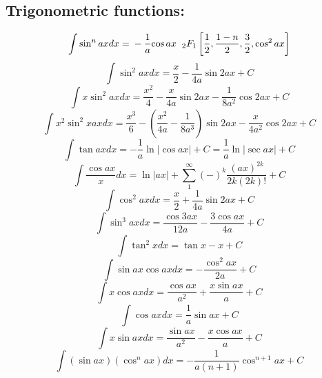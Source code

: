 \documentclass[12pt,a4paper]{article}
\begin{document}
		\subsection*{Trigonometric functions:}
		\begin{equation}
	\int \sin^n ax dx =
	\nonumber \\ 
	-\frac{1}{a}{\cos ax} \hspace{2mm}{_2F_1}\left[
	\frac{1}{2}, \frac{1-n}{2}, \frac{3}{2}, \cos^2 ax
	\right]
\end{equation}
		\begin{equation}
		\int \sin ^2 ax dx = \frac{x}{2} - \frac{1}{4a} \sin 2ax + C
	\end{equation}
	\begin{equation}
		\int x \sin ^2 ax dx = \frac{x^2}{4} - \frac{x}{4a} \sin 2ax - \frac{1}{8a^2} \cos 2ax + C
	\end{equation}
	\begin{equation}
		\int x^2 \sin^2 x ax dx = \frac{x^3}{6} - (\frac{x^2}{4a} - \frac{1}{8a^3})\sin 2ax - \frac{x}{4a^2} \cos 2ax +C
	\end{equation}
	\begin{equation}
		\int \tan ax dx = - \frac{1}{a} \ln |\cos ax| + C = \frac{1}{a} \ln |\sec ax | +C
	\end{equation}
	\begin{equation}
		\int \frac{\cos ax}{x} dx = \ln |ax| + \sum_{1}^{\infty} (-)^k \frac{(ax)^{2k}}{2k (2k)!} +C
	\end{equation}
	\begin{equation}
		\int \cos ^2 ax dx = \frac{x}{2} + \frac{1}{4a} \sin 2ax + C
	\end{equation}
	\begin{equation}
		\int \sin^3 ax dx = \frac{\cos 3ax}{12a} - \frac{3 \cos ax}{4a} + C
	\end{equation}
	\begin{equation}
		\int \tan^2 x dx = \tan x -x +C
	\end{equation}
	\begin{equation}
		\int \sin ax \cos ax dx = - \frac{\cos^2 ax}{2a} + C
	\end{equation}
	\begin{equation}
		\int x \cos ax dx = \frac{\cos ax}{a^2} + \frac{x \sin ax}{a} + C
	\end{equation}
	\begin{equation}
		\int \cos ax dx = \frac{1}{a} \sin ax + C
	\end{equation}
	\begin{equation}
		\int x \sin ax dx = \frac{\sin ax }{a^2} -\frac{x \cos ax }{a} + C
	\end{equation}
	\begin{equation}
		\int (\sin ax) (\cos^n ax) dx = - \frac{1}{a ( n + 1)} \cos ^{n+1} ax + C
	\end{equation}
	
\end{document}
